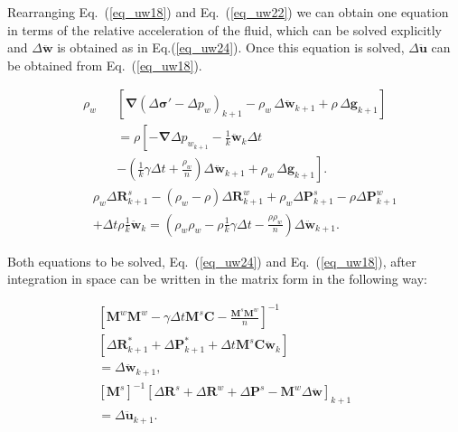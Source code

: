 \documentclass[twocolumn]{svjour3}          %
\begin{document}
Rearranging Eq.~(\ref{eq_uw18}) and Eq.~(\ref{eq_uw22}) we can obtain one equation in terms of the relative acceleration of the fluid, which can be solved explicitly and $\Delta\boldsymbol{ \ddot{w}}$ is obtained as in Eq.(\ref{eq_uw24}). Once this equation is solved, $\Delta\boldsymbol{ \ddot{u}}$ can be obtained from Eq.~(\ref{eq_uw18}).

\begin{eqnarray}\label{eq_uw23} 
\rho_{w}&& \left[\boldsymbol{ \nabla }\left (\Delta\boldsymbol{ \sigma'}-\Delta p_w\right)_{k+1} - \rho_{w}  \, \Delta\boldsymbol{\ddot{w}}_{k+1} +\rho \, \Delta\boldsymbol{g}_{k+1}  \right]  \nonumber \\
&&=\rho \left  [ - \boldsymbol{ \nabla} \Delta p_{w_{k+1}}- \frac{1}{k} \ddot{\boldsymbol{w}}_{k} \Delta t \right.
\nonumber \\
&& \left .- \left( \frac{1}{k} \gamma \Delta t +\frac{\rho_{w}}{n}  \right) \Delta\boldsymbol{  \ddot{w} }_{k+1}+\rho_{w} \,  \Delta\boldsymbol{ g}_{k+1} \right ].
\end{eqnarray}
\begin{eqnarray}\label{eq_uw24} 
&&\rho_{w} \Delta \boldsymbol{ R}^{s}_{k+1}-(\rho_{w} -\rho)\Delta \boldsymbol{R}^{w}_{k+1}  + \rho_{w} \Delta\boldsymbol{P}_{k+1}^{s}-\rho \Delta\boldsymbol{P}_{k+1}^{w}  \nonumber \\ 
&&+\Delta t \rho \frac{1}{k} \ddot{\boldsymbol{w}}_{k}=
\left( \rho_{w}\rho_{w}-\rho \frac{1}{k} \gamma \Delta t -\frac{\rho\rho_{w}}{n}  \right) \Delta\boldsymbol{  \ddot{w} }_{k+1}.
\end{eqnarray}

Both equations to be solved, Eq.~(\ref{eq_uw24}) and Eq.~(\ref{eq_uw18}), after integration in space can be written in the matrix form in the following way:
 
\begin{eqnarray}\label{eq_uw25} 
\left[\boldsymbol{M}^{w}\boldsymbol{M}^{w}-\gamma\Delta t \boldsymbol{M}^{s}\boldsymbol{C} - \frac{\boldsymbol{M}^{s}\boldsymbol{M}^{w}}{n}\right]^{-1} && \nonumber \\
\left[ \Delta\boldsymbol{R}^{*}_{k+1} +\Delta\boldsymbol{P}^{*}_{k+1}+\Delta t \boldsymbol{M}^{s}\boldsymbol{C}\boldsymbol{\ddot{w}}_k \right] && \nonumber \\
=\Delta\boldsymbol{\ddot{w}}_{k+1} ,&&\\
\label{eq_uw26} \left[\boldsymbol{M}^{s}\right]^{-1} \left[ \Delta\boldsymbol{R}^{s} + \Delta\boldsymbol{R}^{w}+\Delta\boldsymbol{P}^{s}-\boldsymbol{M}^{w}\Delta\boldsymbol{\ddot{w}} \right] _{k+1} && \nonumber \\
=\Delta\boldsymbol{\ddot{u}}_{k+1}. &&
\end{eqnarray}
\end{document}
